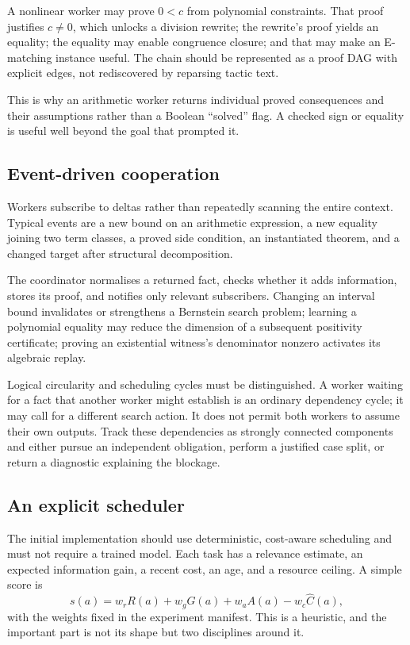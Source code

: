A nonlinear worker may prove $0<c$ from polynomial constraints. That proof
justifies $c\ne0$, which unlocks a division rewrite; the rewrite's proof yields
an equality; the equality may enable congruence closure; and that may make an
E-matching instance useful. The chain should be represented as a proof DAG with
explicit edges, not rediscovered by reparsing tactic text.

This is why an arithmetic worker returns individual proved consequences and
their assumptions rather than a Boolean ``solved'' flag. A checked sign or
equality is useful well beyond the goal that prompted it.

\subsection{Event-driven cooperation}

Workers subscribe to deltas rather than repeatedly scanning the entire context.
Typical events are a new bound on an arithmetic expression, a new equality
joining two term classes, a proved side condition, an instantiated theorem, and
a changed target after structural decomposition.

The coordinator normalises a returned fact, checks whether it adds information,
stores its proof, and notifies only relevant subscribers. Changing an interval
bound invalidates or strengthens a Bernstein search problem; learning a
polynomial equality may reduce the dimension of a subsequent positivity
certificate; proving an existential witness's denominator nonzero activates its
algebraic replay.

Logical circularity and scheduling cycles must be distinguished. A worker
waiting for a fact that another worker might establish is an ordinary
dependency cycle; it may call for a different search action. It does not permit
both workers to assume their own outputs. Track these dependencies as strongly
connected components and either pursue an independent obligation, perform a
justified case split, or return a diagnostic explaining the blockage.

\subsection{An explicit scheduler}

The initial implementation should use deterministic, cost-aware scheduling and
must not require a trained model. Each task has a relevance estimate, an
expected information gain, a recent cost, an age, and a resource ceiling. A
simple score is
\[
  s(a)=w_r R(a)+w_g G(a)+w_a A(a)-w_c\widehat C(a),
\]
with the weights fixed in the experiment manifest. This is a heuristic, and
the important part is not its shape but two disciplines around it.

